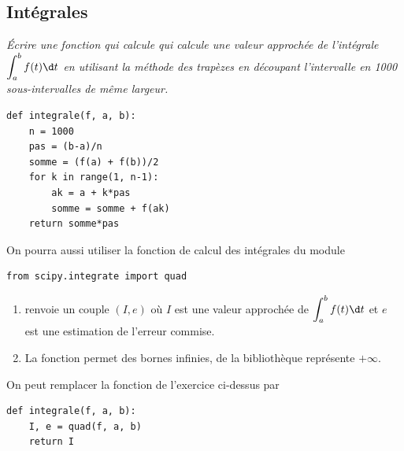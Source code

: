 \subsection{Intégrales}
\begin{Exercise}\it
Écrire une fonction  qui calcule qui calcule une valeur approchée de l'intégrale $\displaystyle \int_a^b f(t) \d t$ en utilisant la méthode des trapèzes en découpant l'intervalle en 1000 sous-intervalles de même largeur.
\end{Exercise}
\begin{Answer}
\begin{lstlisting}
def integrale(f, a, b):
    n = 1000
    pas = (b-a)/n
    somme = (f(a) + f(b))/2
    for k in range(1, n-1):
        ak = a + k*pas
        somme = somme + f(ak)
    return somme*pas
\end{lstlisting}
\end{Answer}

On pourra aussi utiliser la fonction de calcul des intégrales du module 
\begin{lstlisting}
from scipy.integrate import quad
\end{lstlisting}
\begin{enumerate}
\item {} renvoie un couple $(I, e)$ où $I$ est une valeur approchée de $\displaystyle \int_a^b f(t) \d t$ et $e$ est une estimation de l'erreur commise.
\item  La fonction  permet des bornes infinies,  de la bibliothèque  représente $+\infty$.
\end{enumerate}

On peut remplacer la fonction de l'exercice ci-dessus par
\begin{lstlisting}
def integrale(f, a, b):
    I, e = quad(f, a, b)
    return I
\end{lstlisting}
